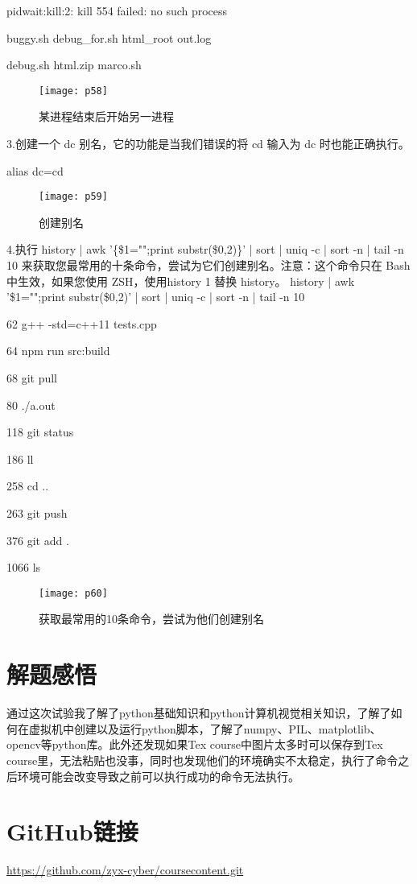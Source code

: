 \documentclass[a4paper ,12pt]{article}
\begin{document}
	pidwait:kill:2: kill 554 failed: no such process
	
	buggy.sh     debug\_for.sh html\_root    out.log
	
	debug.sh     html.zip     marco.sh
	\begin{figure}[h]
		\centering
		\texttt{[image: p58]}
		\caption{某进程结束后开始另一进程}
	\end{figure}
	
	3.创建一个 dc 别名，它的功能是当我们错误的将 cd 输入为 dc 时也能正确执行。
	
	alias dc=cd
	\begin{figure}[h]
		\centering
		\texttt{[image: p59]}
		\caption{创建别名}
	\end{figure}
	
	4.执行 history | awk '\{\$1="";print substr(\$0,2)\}' | sort | uniq -c | sort -n | tail -n 10 来获取您最常用的十条命令，尝试为它们创建别名。注意：这个命令只在 Bash 中生效，如果您使用 ZSH，使用history 1 替换 history。
	history | awk '{\$1="";print substr(\$0,2)}' | sort | uniq -c | sort -n | tail -n 10
	
	62 g++ -std=c++11 tests.cpp
	
	64 npm run src:build
	
	68 git pull
	
	80 ./a.out
	
	118 git status
	
	186 ll
	
	258 cd ..
	
	263 git push
	
	376 git add .
	
	1066 ls
	\begin{figure}[h]
		\centering
		\texttt{[image: p60]}
		\caption{获取最常用的10条命令，尝试为他们创建别名}
	\end{figure}
	
	\section{解题感悟}
	通过这次试验我了解了python基础知识和python计算机视觉相关知识，了解了如何在虚拟机中创建以及运行python脚本，了解了numpy、PIL、matplotlib、opencv等python库。此外还发现如果Tex course中图片太多时可以保存到Tex course里，无法粘贴也没事，同时也发现他们的环境确实不太稳定，执行了命令之后环境可能会改变导致之前可以执行成功的命令无法执行。
	
	\section{GitHub链接}
	\href{https://github.com/zyx-cyber/coursecontent.git}{https://github.com/zyx-cyber/coursecontent.git}
	
	
\end{document}
